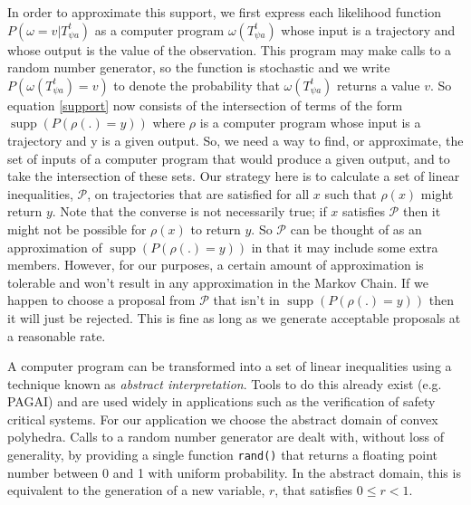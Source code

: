 \documentclass{article}
\DeclareMathOperator\supp{supp}
\begin{document}
In order to approximate this support, we first express each likelihood function $P(\omega=v|T^t_{\psi a})$ as a computer program $\omega(T^t_{\psi a})$ whose input is a trajectory and whose output is the value of the observation. This program may make calls to a random number generator, so the function is stochastic and we write $P(\omega(T^t_{\psi a}) = v)$ to denote the probability that $\omega(T^t_{\psi a})$ returns a value $v$. So equation \ref{support} now consists of the intersection of terms of the form $\supp(P(\rho(.) = y))$ where $\rho$ is a computer program whose input is a trajectory and y is a given output. So, we need a way to find, or approximate, the set of inputs of a computer program that would produce a given output, and to take the intersection of these sets. Our strategy here is to calculate a set of linear inequalities, $\mathcal{P}$, on trajectories that are satisfied for all $x$ such that $\rho(x)$ might return $y$. Note that the converse is not necessarily true; if $x$ satisfies $\mathcal{P}$ then it might not be possible for $\rho(x)$ to return $y$. So $\mathcal{P}$ can be thought of as an approximation of $\supp(P(\rho(.)=y))$ in that it may include some extra members. However, for our purposes, a certain amount of approximation is tolerable and won't result in any approximation in the Markov Chain. If we happen to choose a proposal from $\mathcal{P}$ that isn't in $\supp(P(\rho(.)=y))$ then it will just be rejected. This is fine as long as we generate acceptable proposals at a reasonable rate.

A computer program can be transformed into a set of linear inequalities using a technique known as \textit{abstract interpretation}\cite{cousot1977abstract}. Tools to do this already exist (e.g. PAGAI\cite{henry2012pagai}) and are used widely in applications such as the verification of safety critical systems\cite{blanchet2003static}. For our application we choose the abstract domain of convex polyhedra\cite{cousot1978automatic}\cite{becchi2018efficient}. Calls to a random number generator are dealt with, without loss of generality, by providing a single function \texttt{rand()} that returns a floating point number between 0 and 1 with uniform probability. In the abstract domain, this is equivalent to the generation of a new variable, $r$, that satisfies $0 \le r < 1$.
\end{document}
